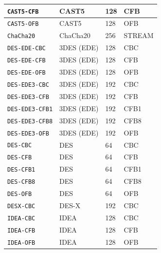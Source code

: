 \documentclass[synpaper]{book}
\begin{document}
\begin{table}[H]
\begin{small}
\begin{tabular}{|l|l|l|l|}
\hline \texttt{CAST5-CFB}         & CAST5           & 128                       & CFB    \\
\hline \texttt{CAST5-OFB}         & CAST5           & 128                       & OFB    \\
\hline \texttt{ChaCha20}          & ChaCha20        & 256                       & STREAM \\
\hline \texttt{DES-EDE-CBC}       & 3DES (EDE)      & 128                       & CBC    \\
\hline \texttt{DES-EDE-CFB}       & 3DES (EDE)      & 128                       & CFB    \\
\hline \texttt{DES-EDE-OFB}       & 3DES (EDE)      & 128                       & OFB    \\
\hline \texttt{DES-EDE3-CBC}      & 3DES (EDE)      & 192                       & CBC    \\
\hline \texttt{DES-EDE3-CFB}      & 3DES (EDE)      & 192                       & CFB    \\
\hline \texttt{DES-EDE3-CFB1}     & 3DES (EDE)      & 192                       & CFB1   \\
\hline \texttt{DES-EDE3-CFB8}     & 3DES (EDE)      & 192                       & CFB8   \\
\hline \texttt{DES-EDE3-OFB}      & 3DES (EDE)      & 192                       & OFB    \\
\hline \texttt{DES-CBC}           & DES             & 64                        & CBC    \\
\hline \texttt{DES-CFB}           & DES             & 64                        & CFB    \\
\hline \texttt{DES-CFB1}          & DES             & 64                        & CFB1   \\
\hline \texttt{DES-CFB8}          & DES             & 64                        & CFB8   \\
\hline \texttt{DES-OFB}           & DES             & 64                        & OFB    \\
\hline \texttt{DESX-CBC}          & DES-X           & 192                       & CBC    \\
\hline \texttt{IDEA-CBC}          & IDEA            & 128                       & CBC    \\
\hline \texttt{IDEA-CFB}          & IDEA            & 128                       & CFB    \\
\hline \texttt{IDEA-OFB}          & IDEA            & 128                       & OFB    \\

\end{tabular}
\end{small}
\end{table}
\end{document}
